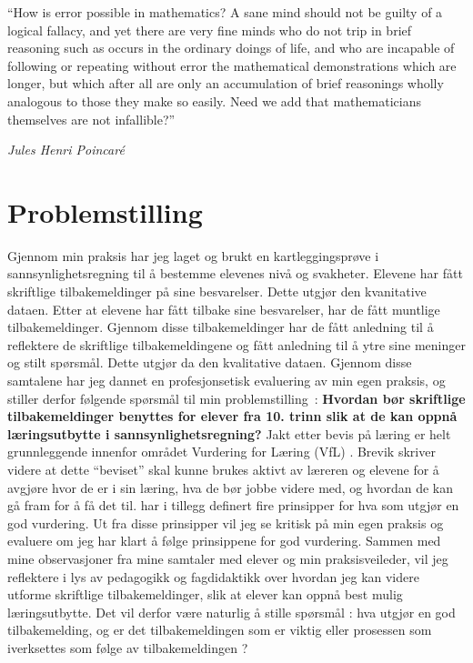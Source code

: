 \documentclass[main.tex]{subfiles}
\begin{document}
\setlength{\epigraphwidth}{0.8\textwidth}
\epigraph{``How is error possible in mathematics? 
A sane mind should not be guilty of a logical fallacy, 
and yet there are very fine minds who do not trip in brief reasoning 
such as occurs in the ordinary doings of life, 
and who are incapable of following or repeating without error 
the mathematical demonstrations which are longer, 
but which after all are only an accumulation of brief reasonings 
wholly analogous to those they make so easily. 
Need we add that mathematicians themselves are not infallible?''}
{\textit{Jules Henri Poincaré}}

\section*{Problemstilling}
Gjennom min praksis har jeg laget og brukt en kartleggingsprøve i sannsynlighetsregning til å bestemme
elevenes nivå og svakheter. Elevene har fått skriftlige tilbakemeldinger på sine besvarelser.
Dette utgjør den kvanitative dataen. Etter at elevene har fått tilbake sine besvarelser, har de fått
muntlige tilbakemeldinger. Gjennom disse tilbakemeldinger har de fått anledning til å reflektere
de skriftlige tilbakemeldingene og fått anledning til å ytre sine meninger og stilt spørsmål. Dette utgjør
da den kvalitative dataen. Gjennom disse samtalene har jeg dannet en profesjonsetisk
evaluering av min egen praksis, og stiller derfor følgende spørsmål til min \mbox{problemstilling :}
\newline
\newline
\textbf{Hvordan bør skriftlige tilbakemeldinger benyttes for elever fra 10.
trinn slik at de kan oppnå læringsutbytte i sannsynlighetsregning?}
\newline
\newline
Jakt etter bevis på læring er helt grunnleggende innenfor området Vurdering for Læring (VfL)
. Brevik skriver videre at dette “beviset” skal kunne brukes aktivt
av læreren og elevene for å avgjøre hvor de er i sin læring, hva de bør jobbe videre med, og
hvordan de kan gå fram for å få det til.  har i tillegg definert fire
prinsipper for hva som utgjør en god vurdering. Ut fra disse prinsipper vil jeg se kritisk på min
egen praksis og evaluere om jeg har klart å følge prinsippene for god vurdering. Sammen med
mine observasjoner fra mine samtaler med elever og min praksisveileder, vil jeg reflektere i lys
av pedagogikk og fagdidaktikk over hvordan jeg kan videre utforme skriftlige tilbakemeldinger,
slik at elever kan oppnå best mulig læringsutbytte. Det vil derfor være naturlig å stille spørsmål :
hva utgjør en god tilbakemelding, og er det tilbakemeldingen som er viktig eller prosessen som
iverksettes som følge av tilbakemeldingen ?  
\end{document}
